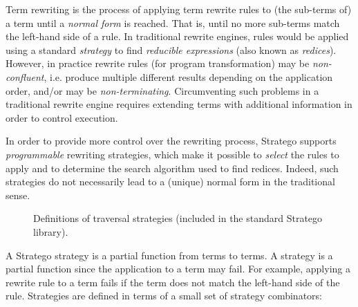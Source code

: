 Term rewriting is the process of applying term rewrite rules to (the sub-terms
of) a term until a \emph{normal form} is reached. That is, until no more
sub-terms match the left-hand side of a rule. In traditional rewrite engines,
rules would be applied using a standard \emph{strategy} to find \emph{reducible
expressions} (also known as \emph{redices}).
However, in practice rewrite rules (for program transformation) may be
\emph{non-confluent}, i.e. produce multiple different results depending on the
application order, and/or may be \emph{non-terminating}. Circumventing such
problems in a traditional rewrite engine requires extending terms with
additional information in order to control execution.

In order to provide more control over the rewriting process, Stratego supports
\emph{programmable} rewriting strategies, which make it possible to
\emph{select} the rules to apply and to determine the search algorithm used to
find redices.
Indeed, such strategies do not necessarily lead to a (unique) normal form in the
traditional sense.

\begin{figure}[t]

\caption{Definitions of traversal strategies (included in the standard
Stratego library).}
\end{figure}

A Stratego strategy is a partial function from terms to terms. A strategy is a
partial function since the application to a term may fail. For example, applying
a rewrite rule to a term fails if the term does not match the left-hand side of
the rule. Strategies are defined in terms of a small set of strategy
combinators:

